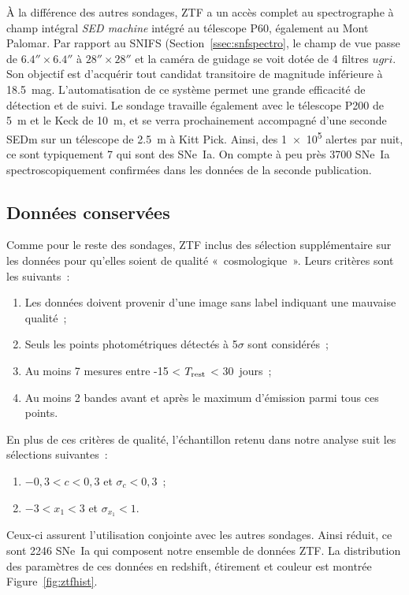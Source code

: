 \documentclass[../main/main.tex]{subfiles}
\begin{document}
À la différence des autres sondages, ZTF a un accès complet au spectrographe à
champ intégral \textit{SED machine} \citep[SEDm, voir][]{blagorodnova2018,
rigault2019} intégré au télescope P60, également au Mont Palomar. Par rapport au
SNIFS (Section~\ref{ssec:snfspectro}, le champ de vue passe de
$\ang{;;6.4}\times\ang{;;6.4}$ à $\ang{;;28}\times\ang{;;28}$ et la caméra de
guidage se voit dotée de 4 filtres $ugri$. Son objectif est d'acquérir tout
candidat transitoire de magnitude inférieure à \SI{18.5}{mag}. L'automatisation
de ce système permet une grande efficacité de détection et de suivi. Le sondage
travaille également avec le télescope P200 de \SI{5}{m} et le Keck de
\SI{10}{m}, et se verra prochainement accompagné d'une seconde SEDm sur un
télescope de \SI{2.5}{m} à Kitt Pick. Ainsi, des \num{1e5} alertes par nuit, ce
sont typiquement 7 qui sont des SNe~Ia. On compte à peu près 3700 SNe~Ia
spectroscopiquement confirmées dans les données de la seconde publication.

\subsection{Données conservées}\label{ssec:ztfdata}

Comme pour le reste des sondages, ZTF inclus des sélection supplémentaire sur
les données pour qu'elles soient de qualité «~cosmologique~». Leurs critères
sont les suivants~:
\begin{enumerate}
    \item Les données doivent provenir d'une image sans label indiquant une
        mauvaise qualité~;
    \item Seuls les points photométriques détectés à 5$\sigma$ sont considérés~;
    \item Au moins 7 mesures entre -15 < $T_{\rm rest}$ < \SI{30}{jours}~;
    \item Au moins 2 bandes avant et après le maximum d'émission parmi tous ces
        points.
\end{enumerate}
En plus de ces critères de qualité, l'échantillon retenu dans notre analyse suit
les sélections suivantes~:
\begin{enumerate}[resume]
    \item $-0,3 < c < 0,3$ et $\sigma_{c} < 0,3$~;
    \item $-3 < x_1 < 3$ et $\sigma_{x_1} < 1$.
\end{enumerate}
Ceux-ci assurent l'utilisation conjointe avec les autres sondages. Ainsi réduit,
ce sont 2246 SNe~Ia qui composent notre ensemble de données ZTF. La distribution
des paramètres de ces données en redshift, étirement et couleur est montrée
Figure~\ref{fig:ztfhist}.
\end{document}
